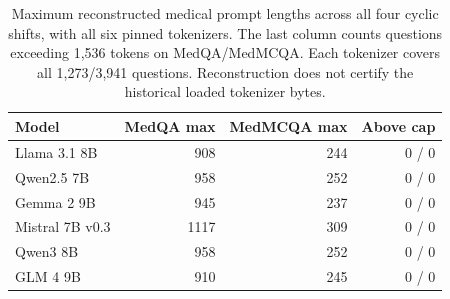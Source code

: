 \begin{table}[htbp]
\centering\small\setlength{\tabcolsep}{4pt}
\caption{Maximum reconstructed medical prompt lengths across all four cyclic shifts, with all six pinned tokenizers. The last column counts questions exceeding 1,536 tokens on MedQA/MedMCQA. Each tokenizer covers all 1,273/3,941 questions. Reconstruction does not certify the historical loaded tokenizer bytes.}
\label{tab:medical-token-lengths}
\begin{tabular}{lrrr}
\toprule
Model & MedQA max & MedMCQA max & Above cap\\
\midrule
Llama 3.1 8B & 908 & 244 & 0 / 0\\
Qwen2.5 7B & 958 & 252 & 0 / 0\\
Gemma 2 9B & 945 & 237 & 0 / 0\\
Mistral 7B v0.3 & 1117 & 309 & 0 / 0\\
Qwen3 8B & 958 & 252 & 0 / 0\\
GLM 4 9B & 910 & 245 & 0 / 0\\
\bottomrule
\end{tabular}
\end{table}
